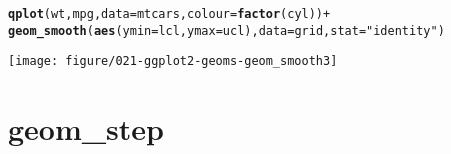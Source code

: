 \documentclass[a4paper,titlepage]{tufte-handout}\usepackage[]{graphicx}\usepackage[]{color}
\makeatletter
\def\maxwidth{ %
  \ifdim\Gin@nat@width>\linewidth
    \linewidth
  \else
    \Gin@nat@width
  \fi
}
\newcommand{\hlstr}[1]{\textcolor[rgb]{0.192,0.494,0.8}{#1}}%
\newcommand{\hlopt}[1]{\textcolor[rgb]{0,0,0}{#1}}%
\newcommand{\hlstd}[1]{\textcolor[rgb]{0.345,0.345,0.345}{#1}}%
\newcommand{\hlkwc}[1]{\textcolor[rgb]{0.333,0.667,0.333}{#1}}%
\newcommand{\hlkwd}[1]{\textcolor[rgb]{0.737,0.353,0.396}{\textbf{#1}}}%
\newenvironment{kframe}{%
 \def\at@end@of@kframe{}%
 \ifinner\ifhmode%
  \def\at@end@of@kframe{\end{minipage}}%
  \begin{minipage}{\columnwidth}%
 \fi\fi%
 \def\FrameCommand##1{\hskip\@totalleftmargin \hskip-\fboxsep
 \colorbox{shadecolor}{##1}\hskip-\fboxsep
     \hskip-\linewidth \hskip-\@totalleftmargin \hskip\columnwidth}%
 \MakeFramed {\advance\hsize-\width
   \@totalleftmargin\z@ \linewidth\hsize
   \@setminipage}}%
 {\par\unskip\endMakeFramed%
 \at@end@of@kframe}
\newenvironment{knitrout}{}{} %
\makeatother
\begin{document}
\begin{knitrout}
\begin{kframe}
\begin{alltt}
\hlkwd{qplot}\hlstd{(wt, mpg,} \hlkwc{data}\hlstd{=mtcars,} \hlkwc{colour}\hlstd{=}\hlkwd{factor}\hlstd{(cyl))} \hlopt{+}
  \hlkwd{geom_smooth}\hlstd{(}\hlkwd{aes}\hlstd{(}\hlkwc{ymin} \hlstd{= lcl,} \hlkwc{ymax} \hlstd{= ucl),} \hlkwc{data}\hlstd{=grid,} \hlkwc{stat}\hlstd{=}\hlstr{"identity"}\hlstd{)}
\end{alltt}
\end{kframe}
\texttt{[image: figure/021-ggplot2-geoms-geom\_smooth3]} 
\begin{kframe}\begin{alltt}


\end{alltt}
\end{kframe}
\end{knitrout}



\section{geom\_step}
\end{document}
